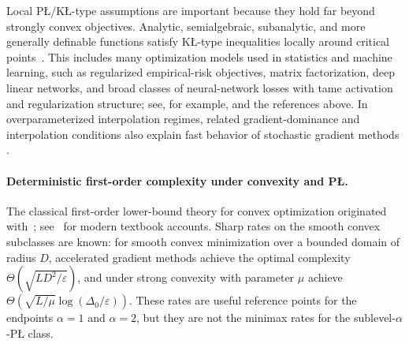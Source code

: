 \documentclass[11pt]{article}
\begin{document}
Local P\L{}/K\L{}-type assumptions are important because they hold far beyond strongly convex objectives. Analytic, semialgebraic,
subanalytic, and more generally definable functions satisfy K\L{}-type inequalities locally around critical
points~\citep{Lojasiewicz1963,Kurdyka1998,BolteDaniilidisLewis2007}. This includes many optimization models used in
statistics and machine learning, such as regularized empirical-risk objectives, matrix factorization, deep linear
networks, and broad classes of neural-network losses with tame activation and regularization structure; see, for
example, \citet{LiuZhuBelkin2022} and the references above. In overparameterized interpolation regimes, related
gradient-dominance and interpolation conditions also explain fast behavior of stochastic gradient methods
\citep{BassilyBelkinMa2018,VaswaniBachSchmidt2019}. %

\paragraph{Deterministic first-order complexity under convexity and P\L{}.}
The classical first-order lower-bound theory for convex optimization originated
with~\citet{NemirovskyYudin1983}; see~\citet{Nesterov2004,Bubeck2015} for modern textbook accounts. 
Sharp rates on the smooth convex subclasses are known: for smooth convex minimization over a bounded domain of radius \(D\), accelerated gradient methods achieve the optimal complexity
\(\Theta(\sqrt{LD^2/\varepsilon})\), and under strong convexity with parameter \(\mu\) achieve
\(\Theta(\sqrt{L/\mu}\log(\Delta_0/\varepsilon))\). These rates are useful reference points for the endpoints \(\alpha=1\) and \(\alpha=2\), but they are not the minimax rates for the sublevel-\(\alpha\)-P\L{} class.%

\end{document}
